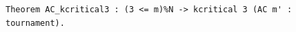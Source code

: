\begin{lstlisting}[language=Rocq]
Theorem AC_kcritical3 : (3 <= m)%N -> kcritical 3 (AC m' : tournament).
\end{lstlisting}
